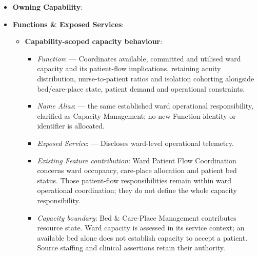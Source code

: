 \begin{itemize}

\item
\textbf{Owning Capability}: \texttt{}



\item
\textbf{Functions \& Exposed Services}:


\begin{itemize}

\item
\textbf{Capability-scoped capacity behaviour}:


\begin{itemize}

\item
\emph{Function}: \texttt{} — Coordinates available, committed and utilised ward capacity and its patient-flow implications, retaining acuity distribution, nurse-to-patient ratios and isolation cohorting alongside bed/\allowbreak{}care-place state, patient demand and operational constraints.



\item
\emph{Name Alias}: \texttt{} — the same established ward operational responsibility, clarified as Capacity Management; no new Function identity or identifier is allocated.



\item
\emph{Exposed Service}: \texttt{} — Discloses ward-level operational telemetry.



\item
\emph{Existing Feature contribution}: Ward Patient Flow Coordination concerns ward occupancy, care-place allocation and patient bed status. Those patient-flow responsibilities remain within ward operational coordination; they do not define the whole capacity responsibility.



\item
\emph{Capacity boundary}: Bed \& Care-Place Management contributes resource state. Ward capacity is assessed in its service context; an available bed alone does not establish capacity to accept a patient. Source staffing and clinical assertions retain their authority.



\end{itemize}



\end{itemize}
\end{itemize}

